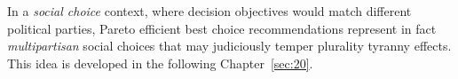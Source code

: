 \vspace{\baselineskip}
In a \emph{social choice} context, where decision objectives would match different political parties, Pareto efficient best choice recommendations represent in fact \emph{multipartisan} social choices that may judiciously temper plurality tyranny effects. This idea is developed in the following Chapter~\ref{sec:20}.


%


